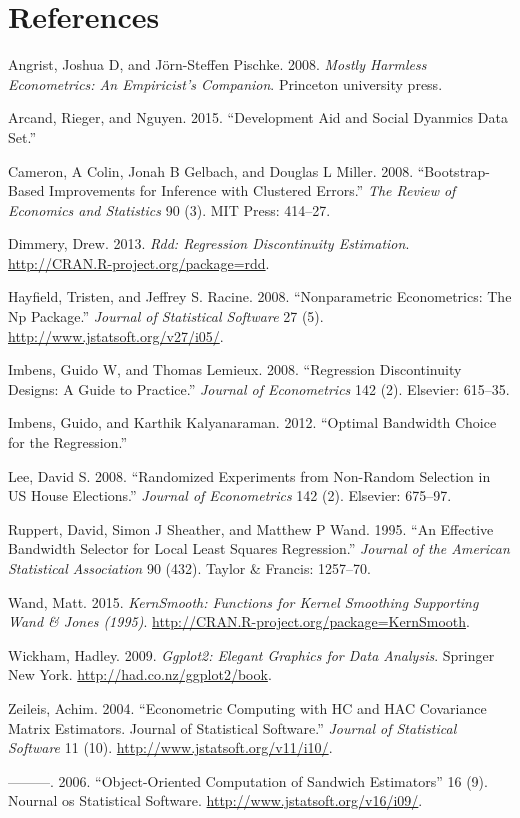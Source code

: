 \documentclass[article]{jss}
\begin{document}
\section*{References}\label{references}

Angrist, Joshua D, and J{ö}rn-Steffen Pischke. 2008. \emph{Mostly
Harmless Econometrics: An Empiricist's Companion}. Princeton university
press.

Arcand, Rieger, and Nguyen. 2015. ``Development Aid and Social Dyanmics
Data Set.''

Cameron, A Colin, Jonah B Gelbach, and Douglas L Miller. 2008.
``Bootstrap-Based Improvements for Inference with Clustered Errors.''
\emph{The Review of Economics and Statistics} 90 (3). MIT Press:
414--27.

Dimmery, Drew. 2013. \emph{Rdd: Regression Discontinuity Estimation}.
\url{http://CRAN.R-project.org/package=rdd}.

Hayfield, Tristen, and Jeffrey S. Racine. 2008. ``Nonparametric
Econometrics: The Np Package.'' \emph{Journal of Statistical Software}
27 (5). \url{http://www.jstatsoft.org/v27/i05/}.

Imbens, Guido W, and Thomas Lemieux. 2008. ``Regression Discontinuity
Designs: A Guide to Practice.'' \emph{Journal of Econometrics} 142 (2).
Elsevier: 615--35.

Imbens, Guido, and Karthik Kalyanaraman. 2012. ``Optimal Bandwidth
Choice for the Regression.''

Lee, David S. 2008. ``Randomized Experiments from Non-Random Selection
in US House Elections.'' \emph{Journal of Econometrics} 142 (2).
Elsevier: 675--97.

Ruppert, David, Simon J Sheather, and Matthew P Wand. 1995. ``An
Effective Bandwidth Selector for Local Least Squares Regression.''
\emph{Journal of the American Statistical Association} 90 (432). Taylor
\& Francis: 1257--70.

Wand, Matt. 2015. \emph{KernSmooth: Functions for Kernel Smoothing
Supporting Wand \& Jones (1995)}.
\url{http://CRAN.R-project.org/package=KernSmooth}.

Wickham, Hadley. 2009. \emph{Ggplot2: Elegant Graphics for Data
Analysis}. Springer New York. \url{http://had.co.nz/ggplot2/book}.

Zeileis, Achim. 2004. ``Econometric Computing with HC and HAC Covariance
Matrix Estimators. Journal of Statistical Software.'' \emph{Journal of
Statistical Software} 11 (10). \url{http://www.jstatsoft.org/v11/i10/}.

---------. 2006. ``Object-Oriented Computation of Sandwich Estimators''
16 (9). Nournal os Statistical Software.
\url{http://www.jstatsoft.org/v16/i09/}.
\end{document}
